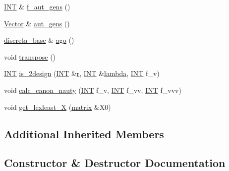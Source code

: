 \begin{DoxyCompactItemize}
\item 
\mbox{\hyperlink{galois_8h_a09fddde158a3a20bd2dcadb609de11dc}{I\+NT}} \& \mbox{\hyperlink{classgeometry_a774f2388490689cf9a1d369327e7e49c}{f\+\_\+aut\+\_\+gens}} ()
\item 
\mbox{\hyperlink{class_vector}{Vector}} \& \mbox{\hyperlink{classgeometry_a75778c5288894993efd4006285711670}{aut\+\_\+gens}} ()
\item 
\mbox{\hyperlink{classdiscreta__base}{discreta\+\_\+base}} \& \mbox{\hyperlink{classgeometry_a161d62ea84c011f07d3e64c42ee4d1ee}{ago}} ()
\item 
void \mbox{\hyperlink{classgeometry_ad7132289ee0bc683f8c00c6762bb5035}{transpose}} ()
\item 
\mbox{\hyperlink{galois_8h_a09fddde158a3a20bd2dcadb609de11dc}{I\+NT}} \mbox{\hyperlink{classgeometry_a31e12da96f9d6f9fd62330bdbc59236d}{is\+\_\+2design}} (\mbox{\hyperlink{galois_8h_a09fddde158a3a20bd2dcadb609de11dc}{I\+NT}} \&\mbox{\hyperlink{alphabet2_8_c_acab531abaa74a7e664e3986f2522b33a}{r}}, \mbox{\hyperlink{galois_8h_a09fddde158a3a20bd2dcadb609de11dc}{I\+NT}} \&\mbox{\hyperlink{plane__search_8_c_ae2170c3116b1f345ee7505695206555e}{lambda}}, \mbox{\hyperlink{galois_8h_a09fddde158a3a20bd2dcadb609de11dc}{I\+NT}} f\+\_\+v)
\item 
void \mbox{\hyperlink{classgeometry_ada4d0bca80d2ad69300625167320dc5d}{calc\+\_\+canon\+\_\+nauty}} (\mbox{\hyperlink{galois_8h_a09fddde158a3a20bd2dcadb609de11dc}{I\+NT}} f\+\_\+v, \mbox{\hyperlink{galois_8h_a09fddde158a3a20bd2dcadb609de11dc}{I\+NT}} f\+\_\+vv, \mbox{\hyperlink{galois_8h_a09fddde158a3a20bd2dcadb609de11dc}{I\+NT}} f\+\_\+vvv)
\item 
void \mbox{\hyperlink{classgeometry_a0fe3595dfda0489759f397fecf455c17}{get\+\_\+lexleast\+\_\+X}} (\mbox{\hyperlink{classmatrix}{matrix}} \&X0)
\end{DoxyCompactItemize}
\subsection*{Additional Inherited Members}


\subsection{Constructor \& Destructor Documentation}
\mbox{\label{classgeometry_ae58cbd128f60cb06e7d4f59295a6db0d}} 
